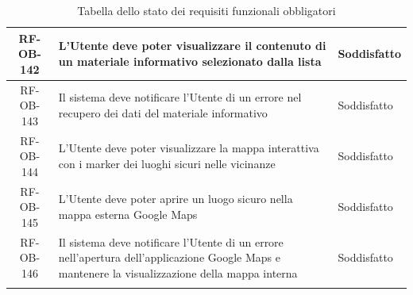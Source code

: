 \documentclass[a4paper,12pt]{article}
\begin{document}
\begin{center}
\begin{longtable}{|c|p{8.5cm}|>{\centering\arraybackslash}p{4cm}|}
RF-OB-142 & L'Utente deve poter visualizzare il contenuto di un materiale informativo selezionato dalla lista & Soddisfatto \\
\hline

RF-OB-143 & Il sistema deve notificare l'Utente di un errore nel recupero dei dati del materiale informativo & Soddisfatto \\
\hline

RF-OB-144 & L'Utente deve poter visualizzare la mappa interattiva con i marker dei luoghi sicuri nelle vicinanze & Soddisfatto \\
\hline

RF-OB-145 & L'Utente deve poter aprire un luogo sicuro nella mappa esterna Google Maps & Soddisfatto \\
\hline

RF-OB-146 & Il sistema deve notificare l'Utente di un errore nell'apertura dell'applicazione Google Maps e mantenere la visualizzazione della mappa interna & Soddisfatto \\
\hline

\caption{Tabella dello stato dei requisiti funzionali obbligatori} \label{tab:stato_requisiti_funzionali_obbligatori} \\
\end{longtable}
\end{center}

\end{document}
